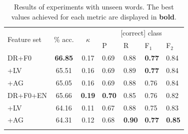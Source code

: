 \documentclass[a4paper]{article}
\begin{document}
		\begin{table}
			\centering
			\caption[Results of experiments with unseen words]{Results of experiments with unseen words. %
			The best values achieved for each metric are displayed in \textbf{bold}.
			}
			\begin{tabularx}{\columnwidth}{lccXXXX}		
			\toprule
			\multirow{2}{*}{Feature set} & \multirow{2}{*}{\% acc.} & \multirow{2}{*}{$\kappa$} & \multicolumn{4}{c}{[correct] class} \\
			\cmidrule(lr){4-7}
			& & & P & R & F$_1$ & F$_2$ \\
			\midrule
DR+F0	&	\textbf{66.85}	&	0.17	&	0.69	&	0.88	&	\textbf{0.77}	&	0.84	\\
+LV %
	&	65.51	&	0.16	&	0.69	&	0.89	&	\textbf{0.77}	&	0.84	\\
+AG %
	&	65.05	&	0.16	&	0.69	&	0.88	&	0.76	&	0.84	\\
			\midrule								
DR+F0+EN	&	65.66	&	\textbf{0.19}	&	\textbf{0.70}	&	0.85	&	0.76	&	0.82	\\
+LV %
	&	64.16	&	0.11	&	0.67	&	0.88	&	0.75	&	0.83	\\
+AG %
	&	64.31	&	0.12	&	0.68	&	\textbf{0.90}	&	\textbf{0.77}	&	\textbf{0.85}	\\

		\bottomrule
			\label{tab:results:words}
			\end{tabularx}
		\end{table}	
		
\end{document}
